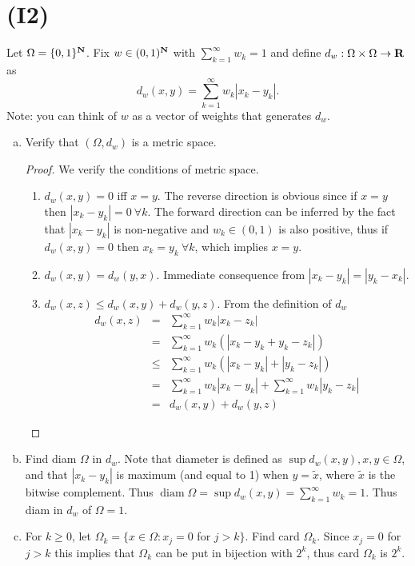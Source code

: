 \documentclass{article}
\newtheorem{proof}{Proof}
\def\le{\leqslant}
\def\to{\rightarrow}
\def\diam{\operatorname{diam}}
\begin{document}
\section*{(I2)}
  Let \(\Omega = \{0,1\}^{\bf N}\).  Fix \(w \in (0,1)^{\bf N}\) with \( \sum_{k=1}^\infty w_k =1\) and define \(d_w: \Omega \times \Omega \to {\bf R}\) as
\[d_w (x,y) = \sum_{k=1}^\infty w_k |x_k-y_k|.\]
Note:  you can think of \(w\) as a vector of weights that generates \(d_w\).
\begin{enumerate}[a)]
\item Verify that \((\Omega, d_w)\) is a metric space.
\begin{proof}
We verify the conditions of metric space.
\begin{enumerate}
\item $d_w(x,y)=0$ iff $x=y$. The reverse direction is obvious
since if $x=y$ then $|x_k-y_k|=0\ \forall k$. The forward direction
can be inferred by the fact that $|x_k-y_k|$ is non-negative and
$w_k\in (0,1)$ is also positive, thus if $d_w(x,y)=0$ then 
$x_k=y_k\ \forall k$, which implies $x=y$.

\item $d_w(x,y) = d_w(y,x)$. Immediate consequence from
$|x_k-y_k|=|y_k-x_k|$.
\item $d_w(x,z) \le d_w(x,y) + d_w(y,z)$. From the definition of $d_w$
\begin{eqnarray}
d_w (x,z) & =  & \sum_{k=1}^\infty w_k |x_k-z_k| \nonumber \\
          & =  & \sum_{k=1}^\infty w_k ( |x_k-y_k + y_k-z_k|) \nonumber \\
          & \le & \sum_{k=1}^\infty w_k ( |x_k-y_k|+|y_k-z_k|)  \nonumber \\
          & = & \sum_{k=1}^\infty w_k |x_k-y_k| + \sum_{k=1}^\infty w_k |y_k-z_k|  \nonumber \\
         & = & d_w(x,y) + d_w(y,z)
\end{eqnarray}
\end{enumerate}
\end{proof}
\item  Find diam \(\Omega\) in \(d_w\).
Note that diameter is defined as $\sup d_w(x,y), x,y\in \Omega$, and that
$|x_k-y_k|$ is maximum (and equal to 1) when $y=\widetilde{x}$, where $\widetilde{x}$ is the bitwise
complement. Thus $\diam\Omega=\sup d_w(x,y) = \sum_{k=1}^\infty w_k=1$.
Thus diam in $d_w$ of $\Omega=1$.
\item  For \( k \geq 0\), let \(\Omega_k = \{x \in \Omega : x_j=0\) for \(j >k \}\). Find card \(\Omega_k\).
Since $x_j=0$ for $j>k$ this implies that $\Omega_k$ can be put in bijection
with $2^k$, thus card $\Omega_k$ is $2^k$.


\end{enumerate}
\end{document}
